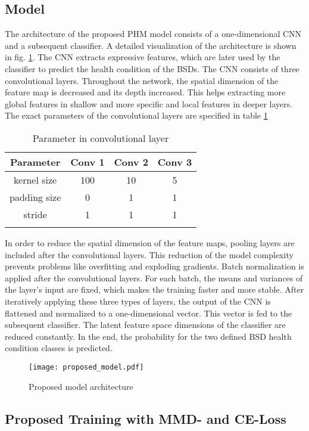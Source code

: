 \subsection{Model}
\label{sec:model}
The architecture of the proposed PHM model consists of a one-dimensional CNN and a subsequent classifier. A detailed visualization of the architecture is shown in fig. \ref{fig:proposed_model}. The CNN extracts expressive features, which are later used by the classifier to predict the health condition of the BSDs. The CNN consists of three convolutional layers. Throughout the network, the spatial dimension of the feature map is decreased and its depth increased. This helps extracting more global features in shallow and more specific and local features in deeper layers. The exact parameters of the convolutional layers are specified in table \ref{tab:parameter_conv} 
\begin{longtable}{c c c c} 
\toprule
Parameter & Conv 1 & Conv 2 & Conv 3 \\
\midrule
kernel size & 100 & 10 & 5 \\

padding size & 0 & 1 & 1 \\

stride & 1 & 1 & 1 \\
\bottomrule
\caption {Parameter in convolutional layer}
\label {tab:parameter_conv}
\end{longtable}

In order to reduce the spatial dimension of the feature maps, pooling layers are included after the convolutional layers. This reduction of the model complexity prevents problems like overfitting and exploding gradients. Batch normalization is applied after the convolutional layers. For each batch, the means and variances of the layer's input are fixed, which makes the training faster and more stable. After iteratively applying these three types of layers, the output of the CNN is flattened and normalized to a one-dimensional vector. This vector is fed to the subsequent classifier. The latent feature space dimensions of the classifier are reduced constantly. In the end, the probability for the two defined BSD health condition classes is predicted.


\begin{figure}[H]
  \centering
  \texttt{[image: proposed\_model.pdf]}
  \caption {Proposed model architecture} \label{fig:proposed_model}
\end{figure}


\subsection{Proposed Training with MMD- and CE-Loss} \label{sec:Proposed_training}

